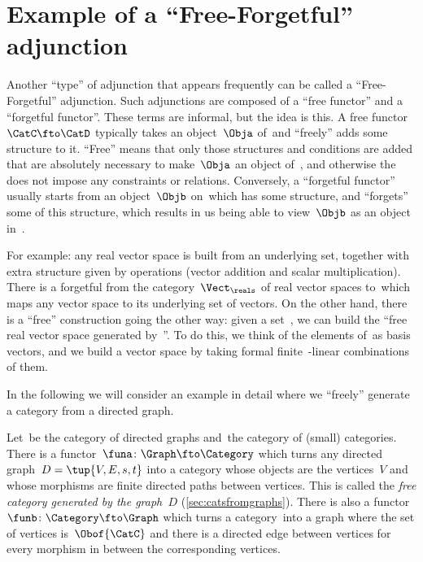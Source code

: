 
\section[Free-forgetful adjunction]{Example of a ``Free-Forgetful'' adjunction}
\label{sec:free-forgetful-adjunction-graph-example}

Another ``type'' of adjunction that appears frequently can be called a ``Free-Forgetful'' adjunction.
Such adjunctions are composed of a ``free functor'' and a ``forgetful functor''.
These terms are informal, but the idea is this.
A free functor~$\CatC \fto \CatD$ typically takes an object~$\Obja$ of~\CatC and ``freely'' adds some structure to it.
``Free'' means that only those structures and conditions are added that are absolutely necessary to make~$\Obja$ an object of~\CatD, and otherwise the  does not impose any constraints or relations.
Conversely, a ``forgetful functor'' usually starts from an object~$\Objb$ on~\CatD which has some structure, and ``forgets'' some of this structure, which results in us being able to view~$\Objb$ as an object in~\CatC.

For example: any real vector space is built from an underlying set, together with extra structure given by operations (vector addition and scalar multiplication).
There is a forgetful  from the category~$\Vect_{\reals}$ of real vector spaces to~\Set which maps any vector space to its underlying set of vectors.
On the other hand, there is a ``free'' construction going the other way: given a set~\setA, we can build the ``free real vector space generated by~\setA''.
To do this, we think of the elements of~\setA as basis vectors, and we build a vector space by taking formal finite~\reals-linear combinations of them.

In the following we will consider an example in detail where we ``freely'' generate a category from a directed graph.

Let~\Graph be the category of directed graphs and~\Category the category of (small) categories.
There is a functor~$\funa \colon \Graph \fto \Category$ which turns any directed graph~$D = \tup{V,E, s,t}$ into a category whose objects are the vertices~$V$ and whose morphisms are finite directed paths between vertices.
This is called the \emph{free category generated by the graph~$D$} (\cref{sec:catsfromgraphs}).
There is also a functor~$\funb \colon \Category \fto \Graph$ which turns a category~\CatC into a graph where the set of vertices is~$\Obof{\CatC}$ and there is a directed edge between vertices for every morphism in \CatC between the corresponding vertices.


